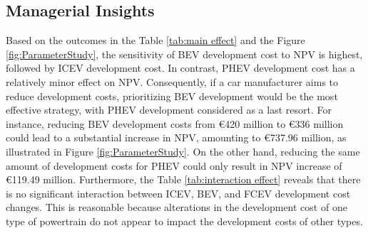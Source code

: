 \subsection{Managerial Insights}\label{Managerial Insights 1}
Based on the outcomes in the Table \ref{tab:main effect} and the Figure \ref{fig:ParameterStudy}, the sensitivity of \gls{BEV} development cost to \gls{NPV} is highest, followed by \gls{ICEV} development cost. In contrast, \gls{PHEV} development cost has a relatively minor effect on \gls{NPV}. Consequently, if a car manufacturer aims to reduce development costs, prioritizing \gls{BEV} development would be the most effective strategy, with \gls{PHEV} development considered as a last resort. For instance, reducing \gls{BEV} development costs from \euro{420} million to  \euro{336} million could lead to a substantial increase in \gls{NPV}, amounting to  \euro{737.96} million, as illustrated in Figure \ref{fig:ParameterStudy}. On the other hand, reducing the same amount of development costs for \gls{PHEV} could only result in \gls{NPV} increase of  \euro{119.49} million.  Furthermore, the Table \ref{tab:interaction effect} reveals that there is no significant interaction between \gls{ICEV}, \gls{BEV}, and \gls{FCEV} development cost changes. This is reasonable because alterations in the development cost of one type of powertrain do not appear to impact the development costs of other types.\\
